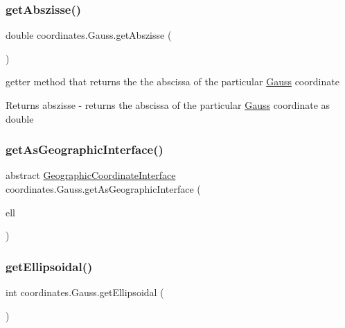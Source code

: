 \subsubsection{\texorpdfstring{get\+Abszisse()}{getAbszisse()}}
{\footnotesize\ttfamily double coordinates.\+Gauss.\+get\+Abszisse (\begin{DoxyParamCaption}{ }\end{DoxyParamCaption})}



getter method that returns the the abscissa of the particular \hyperlink{classcoordinates_1_1_gauss}{Gauss} coordinate 

\begin{DoxyReturn}{Returns}
abszisse -\/ returns the abscissa of the particular \hyperlink{classcoordinates_1_1_gauss}{Gauss} coordinate as double 
\end{DoxyReturn}
\mbox{\label{classcoordinates_1_1_gauss_adb944679772bf8b4101b075247dd0fd0}} 
\subsubsection{\texorpdfstring{get\+As\+Geographic\+Interface()}{getAsGeographicInterface()}}
{\footnotesize\ttfamily abstract \hyperlink{classcoordinates_1_1_geographic_coordinate_interface}{Geographic\+Coordinate\+Interface} coordinates.\+Gauss.\+get\+As\+Geographic\+Interface (\begin{DoxyParamCaption}\item[{\hyperlink{classparams_1_1_ellipsoid_parms}{Ellipsoid\+Parms}}]{ell }\end{DoxyParamCaption})\hspace{0.3cm}{\ttfamily [abstract]}}

\mbox{\label{classcoordinates_1_1_gauss_a5c6271983e9bb69b8d024158397f5882}} 
\subsubsection{\texorpdfstring{get\+Ellipsoidal()}{getEllipsoidal()}}
{\footnotesize\ttfamily int coordinates.\+Gauss.\+get\+Ellipsoidal (\begin{DoxyParamCaption}{ }\end{DoxyParamCaption})}



